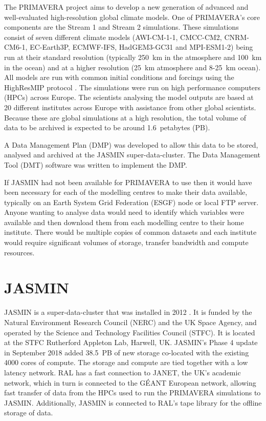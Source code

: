 \documentclass[gmd, manuscript]{copernicus}
\begin{document}


\introduction  %

The PRIMAVERA project aims to develop a new generation of advanced and well-evaluated high-resolution global climate models. One of PRIMAVERA's core components are the Stream 1 and Stream 2 simulations. These simulations consist of seven different climate models (AWI-CM-1-1, CMCC-CM2, CNRM-CM6-1, EC-Earth3P, ECMWF-IFS, HadGEM3-GC31 and MPI-ESM1-2) being run at their standard resolution (typically  250~km in the atmosphere and 100~km in the ocean) and at a higher resolution (25~km atmosphere and 8-25~km ocean). All models are run with common initial conditions and forcings using the HighResMIP protocol \citep{Haarsma2016}. The simulations were run on high performance computers (HPCs) across Europe. The scientists analysing the model outputs are based at 20 different institutes across Europe with assistance from other global scientists. Because these are global simulations at a high resolution, the total volume of data to be archived is expected to be around 1.6~petabytes (PB).

A Data Management Plan (DMP) was developed to allow this data to be stored, analysed and archived at the JASMIN super-data-cluster. The Data Management Tool (DMT) software was written to implement the DMP.

If JASMIN had not been available for PRIMAVERA to use then it would have been necessary for each of the modelling centres to make their data available, typically on an Earth System Grid Federation (ESGF) node or local FTP server. Anyone wanting to analyse data would need to identify which variables were available and then download them from each modelling centre to their home institute. There would be multiple copies of common datasets and each institute would require significant volumes of storage, transfer bandwidth and compute resources.

\section{JASMIN}

JASMIN is a super-data-cluster that was installed in 2012 \citep{lawrence2013storing}. It is funded by the Natural Environment Research Council (NERC) and the UK Space Agency, and operated by the Science and Technology Facilities Council (STFC). It is located at the STFC Rutherford Appleton Lab, Harwell, UK. JASMIN's Phase 4 update in September 2018 added 38.5~PB of new storage co-located with the existing 4000 cores of compute. The storage and compute are tied together with a low latency network. RAL has a fast connection to JANET, the UK's academic network, which in turn is connected to the G\'{E}ANT European network, allowing fast transfer of data from the HPCs used to run the PRIMAVERA simulations to JASMIN. Additionally, JASMIN is connected to RAL's tape library for the offline storage of data.
\end{document}
